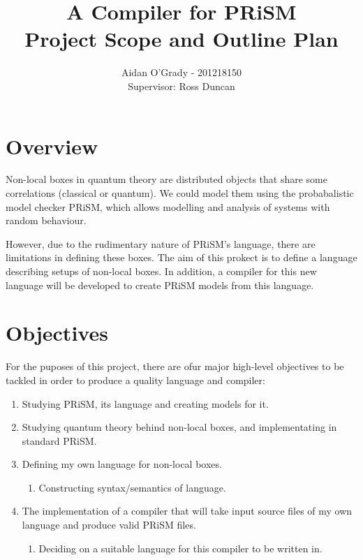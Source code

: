 \documentclass[11pt, a4paper]{article}
\begin{document}
\title{A Compiler for PRiSM \\
\large{Project Scope and Outline Plan}}
\author{Aidan O'Grady - 201218150\\Supervisor: Ross Duncan}
\date{}
\maketitle

\section{Overview} %
\label{sec:overview}
Non-local boxes in quantum theory are distributed objects that share some
correlations (classical or quantum). We could model them using the probabalistic
model checker PRiSM, which allows modelling and analysis of systems with random
behaviour.

However, due to the rudimentary nature of PRiSM's language, there are
limitations in defining these boxes. The aim of this prokect is to define a
language describing setups of non-local boxes. In addition, a compiler for this
new language will be developed to create PRiSM models from this language.


\section{Objectives} %
\label{sec:objectives}
For the puposes of this project, there are ofur major high-level objectives to
be tackled in order to produce a quality language and compiler:
\begin{enumerate}
    \item Studying PRiSM, its language and creating models for it.
    \item Studying quantum theory behind non-local boxes, and implementating
    in standard PRiSM.
    \item Defining my own language for non-local boxes.
    \begin{enumerate}
        \item Constructing syntax/semantics of language.
    \end{enumerate}
    \item The implementation of a compiler that will take input source files of
    my own language and produce valid PRiSM files.
    \begin{enumerate}
        \item Deciding on a suitable language for this compiler to be written
        in.
    \end{enumerate}
\end{enumerate}
\end{document}
